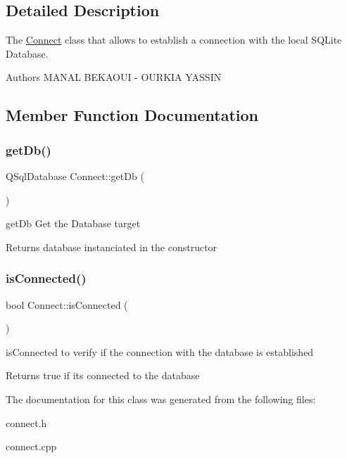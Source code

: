 \subsection{Detailed Description}
The \mbox{\hyperlink{class_connect}{Connect}} class that allows to establish a connection with the local S\+Q\+Lite Database. 

\begin{DoxyAuthor}{Authors}
M\+A\+N\+AL B\+E\+K\+A\+O\+UI -\/ O\+U\+R\+K\+IA Y\+A\+S\+S\+IN 
\end{DoxyAuthor}


\subsection{Member Function Documentation}
\mbox{\label{class_connect_af2e8a4e537c025a0eb058803919728b0}} 
\subsubsection{\texorpdfstring{getDb()}{getDb()}}
{\footnotesize\ttfamily Q\+Sql\+Database Connect\+::get\+Db (\begin{DoxyParamCaption}{ }\end{DoxyParamCaption})}



get\+Db Get the Database target 

\begin{DoxyReturn}{Returns}
database instanciated in the constructor 
\end{DoxyReturn}
\mbox{\label{class_connect_a374f62961fb30b572ea90c43c53d009e}} 
\subsubsection{\texorpdfstring{isConnected()}{isConnected()}}
{\footnotesize\ttfamily bool Connect\+::is\+Connected (\begin{DoxyParamCaption}{ }\end{DoxyParamCaption})}



is\+Connected to verify if the connection with the database is established 

\begin{DoxyReturn}{Returns}
true if it\textquotesingle{}s connected to the database 
\end{DoxyReturn}


The documentation for this class was generated from the following files\+:\begin{DoxyCompactItemize}
\item 
connect.\+h\item 
connect.\+cpp\end{DoxyCompactItemize}
